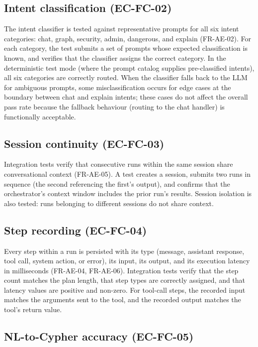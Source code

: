 \documentclass[a4paper,noexaminfo]{sapthesis}
\begin{document}
\subsection{Intent classification (EC-FC-02)}

The intent classifier is tested against representative prompts for all
six intent categories: chat, graph, security, admin, dangerous, and
explain (FR-AE-02).  For each category, the test submits a set of
prompts whose expected classification is known, and verifies that the
classifier assigns the correct category.  In the deterministic test mode
(where the prompt catalog supplies pre-classified intents), all six
categories are correctly routed.  When the classifier falls back to the
LLM for ambiguous prompts, some misclassification occurs for edge cases
at the boundary between chat and explain intents; these cases do not
affect the overall pass rate because the fallback behaviour (routing to
the chat handler) is functionally acceptable.

\subsection{Session continuity (EC-FC-03)}

Integration tests verify that consecutive runs within the same session
share conversational context (FR-AE-05).  A test creates a session,
submits two runs in sequence (the second referencing the first's output),
and confirms that the orchestrator's context window includes the prior
run's results.  Session isolation is also tested: runs belonging to
different sessions do not share context.

\subsection{Step recording (EC-FC-04)}

Every step within a run is persisted with its type (message, assistant
response, tool call, system action, or error), its input, its output,
and its execution latency in milliseconds (FR-AE-04, FR-AE-06).
Integration tests verify that the step count matches the plan length,
that step types are correctly assigned, and that latency values are
positive and non-zero.  For tool-call steps, the recorded input matches
the arguments sent to the tool, and the recorded output matches the
tool's return value.

\subsection{NL-to-Cypher accuracy (EC-FC-05)}
\end{document}

